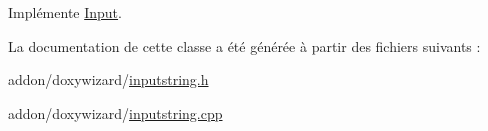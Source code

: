 Implémente \hyperlink{class_input_a761f73fb00d6e0e3e391edafcfde1134}{Input}.



La documentation de cette classe a été générée à partir des fichiers suivants \+:\begin{DoxyCompactItemize}
\item 
addon/doxywizard/\hyperlink{inputstring_8h}{inputstring.\+h}\item 
addon/doxywizard/\hyperlink{inputstring_8cpp}{inputstring.\+cpp}\end{DoxyCompactItemize}
